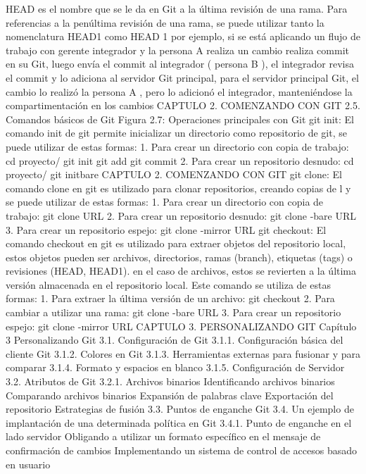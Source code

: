 \documentclass[12pt, spanish, oneside, onecolumn, a4paper]{report}
\begin{document}
HEAD es el nombre que se le da en Git a la última revisión de una rama. Para referencias a la penúltima revisión de una rama, se puede utilizar tanto la nomenclatura HEAD1 como HEAD
1 por ejemplo, si se está aplicando un flujo de trabajo con gerente integrador y la persona A realiza un cambio realiza commit en su Git, luego envía el commit al integrador ( persona B ), el integrador revisa el commit y lo adiciona al servidor Git principal, para el servidor principal Git, el cambio lo realizó la persona A , pero lo adicionó el integrador, manteniéndose la compartimentación en los cambios
 CAPTULO 2. COMENZANDO CON GIT 2.5. Comandos básicos de Git
Figura 2.7: Operaciones principales con Git
git init: El comando init de git permite inicializar un directorio como repositorio de git, se puede utilizar de estas formas:
1. Para crear un directorio con copia de trabajo:
 cd proyecto/
 git init
 git add
 git commit
2. Para crear un repositorio desnudo:
 cd proyecto/
 git initbare
 CAPTULO 2. COMENZANDO CON GIT git clone: El comando clone en git es utilizado para clonar repositorios, creando copias de l y se puede utilizar de estas formas:
1. Para crear un directorio con copia de trabajo:
 git clone URL
2. Para crear un repositorio desnudo:
 git clone -bare URL
3. Para crear un repositorio espejo:
 git clone -mirror URL
git checkout: El comando checkout en git es utilizado para extraer objetos del repositorio local, estos objetos pueden ser archivos, directorios, ramas (branch), etiquetas (tags) o revisiones (HEAD, HEAD1). en el caso de archivos, estos se revierten a la última versión almacenada en el repositorio local. Este comando se utiliza de estas formas:
1. Para extraer la última versión de un archivo:
 git checkout
2. Para cambiar a utilizar una rama:
 git clone -bare URL
3. Para crear un repositorio espejo:
 git clone -mirror URL
  CAPTULO 3. PERSONALIZANDO GIT Capítulo 3
Personalizando Git
3.1. Configuración de Git
3.1.1. Configuración básica del cliente Git
3.1.2. Colores en Git
3.1.3. Herramientas externas para fusionar y para comparar
3.1.4. Formato y espacios en blanco
3.1.5. Configuración de Servidor
3.2. Atributos de Git
3.2.1. Archivos binarios
Identificando archivos binarios
Comparando archivos binarios
Expansión de palabras clave
Exportación del repositorio
Estrategias de fusión
3.3. Puntos de enganche Git
3.4. Un ejemplo de implantación de una determinada política en
Git
3.4.1. Punto de enganche en el lado servidor
Obligando a utilizar un formato específico en el mensaje de confirmación de cambios
Implementando un sistema de control de accesos basado en usuario
\end{document}
